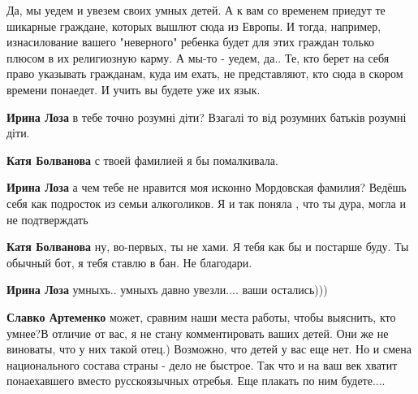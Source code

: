 \begin{itemize}


Да, мы уедем и увезем своих умных детей. А к вам со временем приедут те
шикарные граждане, которых вышлют сюда из Европы. И тогда, например,
изнасилование вашего "неверного" ребенка будет для этих граждан только плюсом в
их религиозную карму. А мы-то - уедем, да.. Те, кто берет на себя право
указывать гражданам, куда им ехать, не представляют, кто сюда в скором времени
понаедет. И учить вы будете уже их язык.\Smiley[1.0][yellow]

\begin{itemize}

\textbf{Ирина Лоза} в тебе точно розумні діти? Взагалі то від розумних батьків розумні діти.


\textbf{Катя Болванова} с твоей фамилией я бы помалкивала.\Smiley[1.0][yellow]


\textbf{Ирина Лоза} а чем тебе не нравится моя исконно Мордовская фамилия? Ведёшь себя как подросток из семьи алкоголиков. Я и так поняла , что ты дура, могла и не подтверждать


\textbf{Катя Болванова} ну, во-первых, ты не хами. Я тебя как бы и постарше буду. Ты обычный бот, я тебя ставлю в бан. Не благодари.\Smiley[1.0][yellow]


\textbf{Ирина Лоза} умныхъ.. умныхъ давно увезли.... ваши остались)))


\textbf{Славко Артеменко} может, сравним наши места работы, чтобы выяснить, кто
умнее?\Smiley[1.0][yellow] В отличие от вас, я не стану комментировать ваших детей. Они же не
виноваты, что у них такой отец.) Возможно, что детей у вас еще нет. Но и смена
национального состава страны - дело не быстрое. Так что и на ваш век хватит
понаехавшего вместо русскоязычных отребья. Еще плакать по ним будете....
\end{itemize}

\end{itemize}

